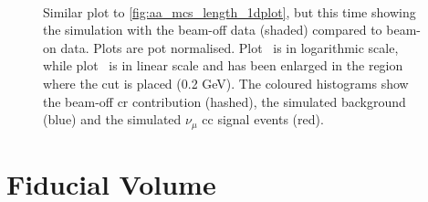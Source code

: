 \begin{figure}[]
\centering
{}
 \\
\caption[\acrshort{mcs} and Range-Based Momentum in Data]{Similar plot to \ref{fig:aa_mcs_length_1dplot}, but this time showing the simulation with the beam-off data (shaded) compared to beam-on data. Plots are \acrshort{pot} normalised. Plot~\protect{} is in logarithmic scale, while plot~\protect{} is in linear scale and has been enlarged in the region where the cut is placed (0.2 GeV). The coloured histograms show the beam-off \acrshort{cr} contribution (hashed), the simulated background (blue) and the simulated $\nu_\mu$ \acrshort{cc} signal events (red).}
\label{fig:mcs_length_cut_2}
\end{figure}




\section{Fiducial Volume}
\label{sec:fiducial_volume}

